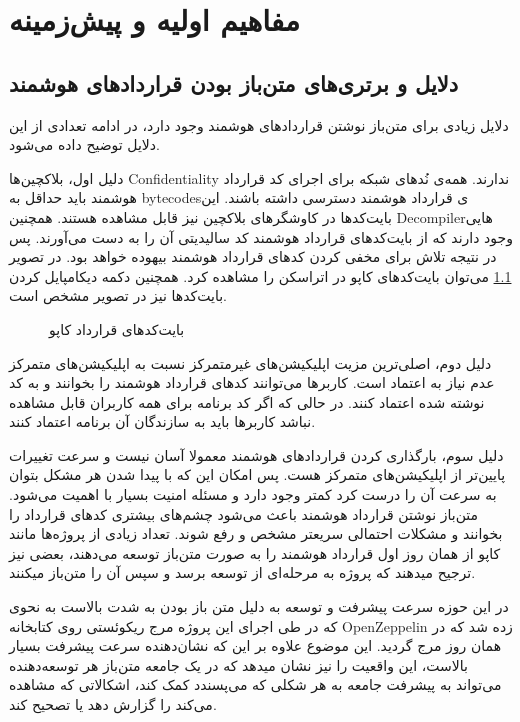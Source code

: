 \chapter{مفاهیم اولیه و پیش‌زمینه}
\section{دلایل و برتری‌های متن‌باز بودن قرارداد‌های هوشمند}
دلایل زیادی برای متن‌باز نوشتن قراردادهای هوشمند وجود دارد، در ادامه تعدادی از این دلایل توضیح داده می‌شود.

دلیل اول، بلاکچین‌ها
\gls{Confidentiality}
ندارند.
همه‌ی نُد‌های شبکه برای اجرای کد قرارداد هوشمند باید حداقل به
\glspl{bytecode}ی
قرارداد هوشمند دسترسی داشته باشند. این بایت‌کد‌ها در کاوشگرهای بلاکچین نیز قابل مشاهده هستند.
همچنین
\gls{Decompiler}هایی
وجود دارند که از بایت‌کد‌های قرارداد هوشمند کد سالیدیتی آن را به دست می‌آورند.
پس در نتیجه تلاش برای مخفی کردن کدهای قرارداد هوشمند بیهوده خواهد بود.
در تصویر
\ref{fig:cappu-bytecodes}
می‌توان بایت‌کدهای کاپو در اتراسکن را مشاهده کرد.
همچنین دکمه دیکامپایل کردن بایت‌کد‌ها نیز در تصویر مشخص است.

\begin{figure}[H]
\centerline{}
\caption{بایت‌کدهای قرارداد کاپو}
\label{fig:cappu-bytecodes}
\end{figure}

دلیل دوم، اصلی‌ترین مزیت اپلیکیشن‌های غیرمتمرکز نسبت به اپلیکیشن‌های متمرکز عدم نیاز به اعتماد است.
کاربرها می‌توانند کد‌های قرارداد هوشمند را بخوانند و به کد نوشته شده اعتماد کنند.‌
در حالی که اگر کد برنامه برای همه کاربران قابل مشاهده نباشد کاربرها باید به سازندگان آن برنامه اعتماد کنند.

دلیل سوم، بارگذاری کردن قرارداد‌های هوشمند معمولا آسان نیست
و سرعت تغییرات پایین‌تر از اپلیکیشن‌های متمرکز هست.‌
پس امکان این که با پیدا شدن هر مشکل بتوان به سرعت آن را درست کرد کمتر وجود دارد
و مسئله امنیت بسیار با اهمیت می‌شود.
متن‌باز نوشتن قرارداد هوشمند باعث می‌شود چشم‌های بیشتری کدهای قرارداد را بخوانند
و مشکلات احتمالی سریعتر مشخص و رفع شوند.
تعداد زیادی از پروژه‌ها مانند کاپو از همان روز اول قرارداد هوشمند را به صورت متن‌باز توسعه می‌دهند،
بعضی نیز ترجیح میدهند که پروژه به مرحله‌ای از توسعه برسد و سپس آن را متن‌باز میکنند.

در این حوزه سرعت پیشرفت و توسعه به دلیل متن باز بودن به شدت بالاست
به نحوی که در طی اجرای این پروژه مرج ریکوئستی روی کتابخانه
\gls{OpenZeppelin}
زده شد که در همان روز مرج گردید.
این موضوع علاوه بر این که نشان‌دهنده سرعت پیشرفت بسیار بالاست،
این واقعیت را نیز نشان میدهد که در یک جامعه متن‌باز هر توسعه‌دهنده
می‌تواند به پیشرفت جامعه به هر شکلی که می‌پسندد کمک کند،
اشکالاتی که مشاهده می‌کند را گزارش دهد یا تصحیح کند.

